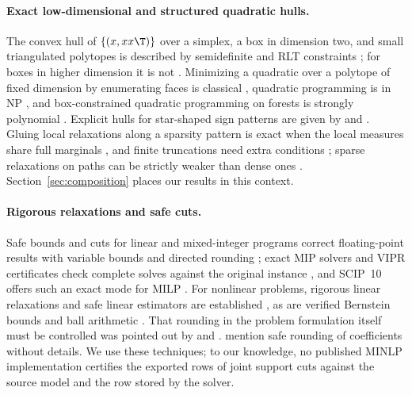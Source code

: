 \paragraph{Exact low-dimensional and structured quadratic hulls.}
The convex hull of $\{(x,xx\T)\}$ over a simplex, a box in dimension two,
and small triangulated polytopes is described by semidefinite and RLT
constraints \citep{AnstreicherBurer2010}; for boxes in higher dimension
it is not \citep{BurerLetchford2009,Anstreicher2012}. Minimizing a
quadratic over a polytope of fixed dimension by enumerating faces is
classical \citep[Section~2.9]{Murty1997}, quadratic programming is in NP
\citep{Vavasis1990}, and box-constrained quadratic programming on forests
is strongly polynomial \citep{DelPiaKhajavirad2026}. Explicit hulls for
star-shaped sign patterns are given by \citet{DeyKhajavirad2025} and
\citet{Khajavirad2026}. Gluing local relaxations along a sparsity pattern
is exact when the local measures share full marginals
\citep{Vorobev1962,Lasserre2006}, and finite truncations need extra
conditions \citep{FantuzziFuentes2025}; sparse relaxations on paths can be
strictly weaker than dense ones \citep{NieDemmel2009,NieQuTangZhang2026}.
Section~\ref{sec:composition} places our results in this context.

\paragraph{Rigorous relaxations and safe cuts.}
Safe bounds and cuts for linear and mixed-integer programs correct
floating-point results with variable bounds and directed rounding
\citep{NeumaierShcherbina2004,CookEtAl2009SafeCuts,EiflerGleixner2024};
exact MIP solvers and VIPR certificates check complete solves against
the original instance \citep{CookKochSteffyWolter2013,CheungGleixnerSteffy2017,EiflerGleixner2023},
and SCIP~10 offers such an exact mode for MILP \citep{SCIP10}. For nonlinear
problems, rigorous linear relaxations and safe linear estimators are
established \citep{BorradaileVanHentenryck2005,Kearfott2011,DomesNeumaier2012,NininMessineHansen2015},
as are verified Bernstein bounds \citep{GarloffJanssonSmith2003JCAM,GarloffSmith2008,MunozNarkawicz2013}
and ball arithmetic \citep{Johansson2017arb}. That rounding in the problem
formulation itself must be controlled was pointed out by
\citet[Section~20]{Neumaier2004} and \citet{SchichlNeumaier2005}.
\citet{LiersEtAl2021} mention safe rounding of coefficients without
details. We use these techniques; to our knowledge, no published MINLP
implementation certifies the exported rows of joint support cuts against
the source model and the row stored by the solver.

